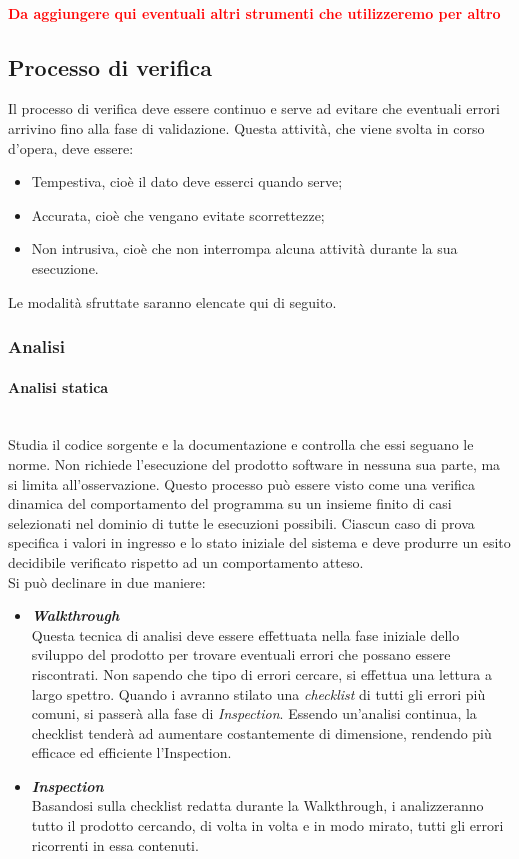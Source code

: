 \paragraph{\textcolor{red}{Da aggiungere qui eventuali altri strumenti che utilizzeremo per altro}}
\subsection{Processo di verifica}
Il processo di verifica deve essere continuo e serve ad evitare che eventuali errori arrivino fino alla fase di validazione.
Questa attività, che viene svolta in corso d'opera, deve essere:
\begin{itemize}
	\item Tempestiva, cioè il dato deve esserci quando serve;
	\item Accurata, cioè che vengano evitate scorrettezze;
	\item Non intrusiva, cioè che non interrompa alcuna attività durante la sua esecuzione.
\end{itemize}
Le modalità sfruttate saranno elencate qui di seguito.
\subsubsection{Analisi}
\paragraph{Analisi statica}
~\\Studia il codice sorgente e la documentazione e controlla che essi seguano le norme. Non richiede l'esecuzione del prodotto software in nessuna sua parte, ma si limita all'osservazione. Questo processo può essere visto come una verifica dinamica del comportamento del programma su un insieme finito di casi selezionati nel dominio di tutte le esecuzioni possibili. Ciascun caso di prova specifica i valori in ingresso e lo stato iniziale del sistema e deve produrre un esito decidibile verificato rispetto ad un comportamento atteso. 
\\Si può declinare in due maniere:
\begin{itemize}
	\item \emph{\textbf{Walkthrough}}
	~\\Questa tecnica di analisi deve essere effettuata nella fase iniziale dello sviluppo del prodotto per trovare eventuali errori che possano essere riscontrati. Non sapendo che tipo di errori cercare, si effettua una lettura a largo spettro. Quando i \vers{} avranno stilato una \emph{checklist} di tutti gli errori più comuni, si passerà alla fase di \emph{Inspection}. Essendo un'analisi continua, la checklist tenderà ad aumentare costantemente di dimensione, rendendo più efficace ed efficiente l'Inspection.
	\item \emph{\textbf{Inspection}}
	~\\Basandosi sulla checklist redatta durante la Walkthrough, i \vers{} analizzeranno tutto il prodotto cercando, di volta in volta e in modo mirato, tutti gli errori ricorrenti in essa contenuti.
\end{itemize}

